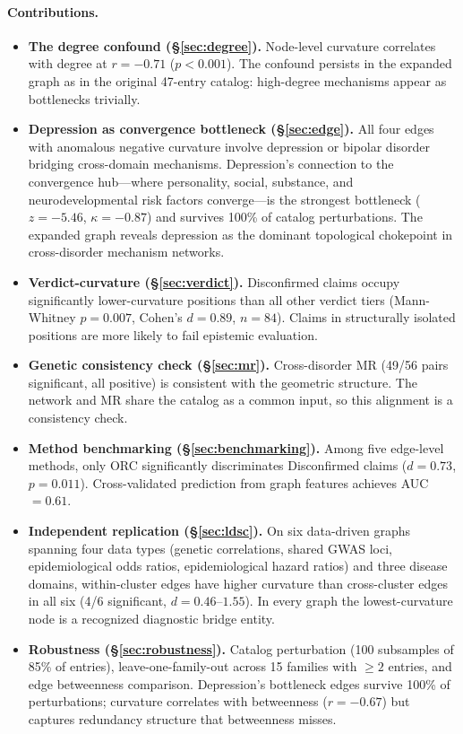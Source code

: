 \documentclass{article}
\begin{document}
\paragraph{Contributions.}
\begin{itemize}
\item \textbf{The degree confound (\S\ref{sec:degree}).} Node-level curvature correlates with degree at $r = -0.71$ ($p < 0.001$). The confound persists in the expanded graph as in the original 47-entry catalog: high-degree mechanisms appear as bottlenecks trivially.
\item \textbf{Depression as convergence bottleneck (\S\ref{sec:edge}).} All four edges with anomalous negative curvature involve depression or bipolar disorder bridging cross-domain mechanisms. Depression's connection to the convergence hub---where personality, social, substance, and neurodevelopmental risk factors converge---is the strongest bottleneck ($z = -5.46$, $\kappa = -0.87$) and survives 100\% of catalog perturbations. The expanded graph reveals depression as the dominant topological chokepoint in cross-disorder mechanism networks.
\item \textbf{Verdict-curvature (\S\ref{sec:verdict}).} Disconfirmed claims occupy significantly lower-curvature positions than all other verdict tiers (Mann-Whitney $p = 0.007$, Cohen's $d = 0.89$, $n = 84$). Claims in structurally isolated positions are more likely to fail epistemic evaluation.
\item \textbf{Genetic consistency check (\S\ref{sec:mr}).} Cross-disorder MR (49/56 pairs significant, all positive) is consistent with the geometric structure. The network and MR share the catalog as a common input, so this alignment is a consistency check.
\item \textbf{Method benchmarking (\S\ref{sec:benchmarking}).} Among five edge-level methods, only ORC significantly discriminates Disconfirmed claims ($d = 0.73$, $p = 0.011$). Cross-validated prediction from graph features achieves AUC $= 0.61$.
\item \textbf{Independent replication (\S\ref{sec:ldsc}).} On six data-driven graphs spanning four data types (genetic correlations, shared GWAS loci, epidemiological odds ratios, epidemiological hazard ratios) and three disease domains, within-cluster edges have higher curvature than cross-cluster edges in all six (4/6 significant, $d = 0.46$--$1.55$). In every graph the lowest-curvature node is a recognized diagnostic bridge entity.
\item \textbf{Robustness (\S\ref{sec:robustness}).} Catalog perturbation (100 subsamples of 85\% of entries), leave-one-family-out across 15 families with $\geq 2$ entries, and edge betweenness comparison. Depression's bottleneck edges survive 100\% of perturbations; curvature correlates with betweenness ($r = -0.67$) but captures redundancy structure that betweenness misses.
\end{itemize}
\end{document}
